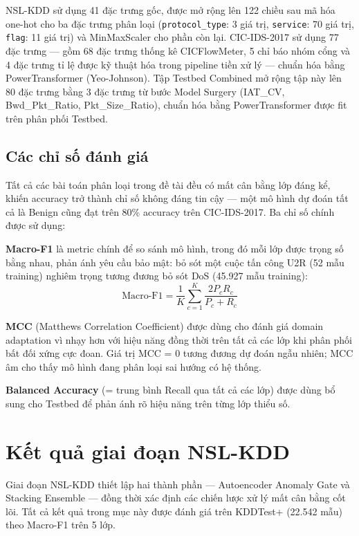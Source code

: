 \documentclass[../DoAn.tex]{subfiles}
\begin{document}
NSL-KDD sử dụng 41 đặc trưng gốc, được mở rộng lên 122 chiều sau mã hóa one-hot cho ba đặc trưng phân loại (\texttt{protocol\_type}: 3 giá trị, \texttt{service}: 70 giá trị, \texttt{flag}: 11 giá trị) và MinMaxScaler cho phần còn lại. CIC-IDS-2017 sử dụng 77 đặc trưng --- gồm 68 đặc trưng thống kê CICFlowMeter, 5 chỉ báo nhóm cổng và 4 đặc trưng tỉ lệ được kỹ thuật hóa trong pipeline tiền xử lý --- chuẩn hóa bằng PowerTransformer (Yeo-Johnson). Tập Testbed Combined mở rộng tập này lên 80 đặc trưng bằng 3 đặc trưng từ bước Model Surgery (IAT\_CV, Bwd\_Pkt\_Ratio, Pkt\_Size\_Ratio), chuẩn hóa bằng PowerTransformer được fit trên phân phối Testbed.

\subsection{Các chỉ số đánh giá}
\label{subsec:tn-metrics}

Tất cả các bài toán phân loại trong đề tài đều có mất cân bằng lớp đáng kể, khiến accuracy trở thành chỉ số không đáng tin cậy --- một mô hình dự đoán tất cả là Benign cũng đạt trên 80\% accuracy trên CIC-IDS-2017. Ba chỉ số chính được sử dụng:

\textbf{Macro-F1} là metric chính để so sánh mô hình, trong đó mỗi lớp được trọng số bằng nhau, phản ánh yêu cầu bảo mật: bỏ sót một cuộc tấn công U2R (52 mẫu training) nghiêm trọng tương đương bỏ sót DoS (45.927 mẫu training):
\begin{equation}
    \text{Macro-F1} = \frac{1}{K}\sum_{c=1}^{K}\frac{2 P_c R_c}{P_c + R_c}
    \label{eq:macro-f1}
\end{equation}

\textbf{MCC} (Matthews Correlation Coefficient) được dùng cho đánh giá domain adaptation vì nhạy hơn với hiệu năng đồng thời trên tất cả các lớp khi phân phối bất đối xứng cực đoan. Giá trị MCC = 0 tương đương dự đoán ngẫu nhiên; MCC âm cho thấy mô hình đang phân loại sai hướng có hệ thống.

\textbf{Balanced Accuracy} (= trung bình Recall qua tất cả các lớp) được dùng bổ sung cho Testbed để phản ánh rõ hiệu năng trên từng lớp thiểu số.

\section{Kết quả giai đoạn NSL-KDD}
\label{sec:tn-nslkdd}

Giai đoạn NSL-KDD thiết lập hai thành phần --- Autoencoder Anomaly Gate và Stacking Ensemble --- đồng thời xác định các chiến lược xử lý mất cân bằng cốt lõi. Tất cả kết quả trong mục này được đánh giá trên KDDTest+ (22.542 mẫu) theo Macro-F1 trên 5 lớp.
\end{document}
